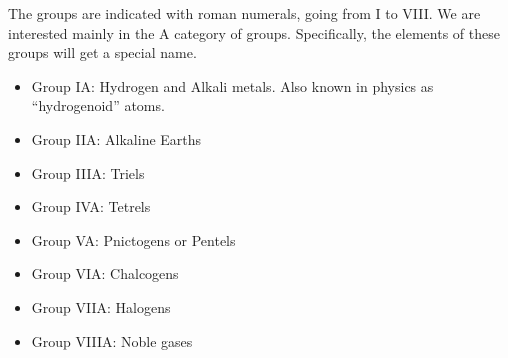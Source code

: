 \documentclass[../qm.tex]{subfiles}
\begin{document}
The groups are indicated with roman numerals, going from I to VIII. We are interested mainly in the A category of groups. Specifically, the elements of these groups will get a special name.
\begin{itemize}
\item Group IA: Hydrogen and Alkali metals. Also known in physics as ``hydrogenoid'' atoms.
\item Group IIA: Alkaline Earths
\item Group IIIA: Triels
\item Group IVA: Tetrels
\item Group VA: Pnictogens or Pentels
\item Group VIA: Chalcogens
\item Group VIIA: Halogens
\item Group VIIIA: Noble gases
\end{itemize}
\end{document}
